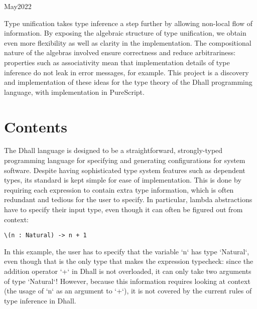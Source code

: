\documentclass[11pt, twoside, reqno]{book}
\makeatletter
\renewcommand\tableofcontents{%
    \if@twocolumn
      \@restonecoltrue\onecolumn
    \else
      \@restonecolfalse
    \fi
    \chapter*{\contentsname
        \@mkboth{%
           \contentsname}{\contentsname}}%
    \@starttoc{toc}%
    \if@restonecol\twocolumn\fi
    }
\makeatother
\begin{document}
\renewcommand{\contentsname}{Contents}
\fancyhead[LE]{\textit{\nouppercase{\leftmark}}}
\fancyhead[RO]{\textit{\nouppercase{\rightmark}}}

    {May}{2022}

\abstr

Type unification takes type inference a step further by allowing non-local flow of information.
By exposing the algebraic structure of type unification, we obtain even more flexibility as well as clarity in the implementation.
The compositional nature of the algebras involved ensure correctness and reduce arbitrariness: properties such as associativity mean that implementation details of type inference do not leak in error messages, for example.
This project is a discovery and implementation of these ideas for the type theory of the Dhall programming language, with implementation in PureScript.


\tableofcontents





\startmain

\intro

The Dhall language is designed to be a straightforward, strongly-typed programming language for specifying and generating configurations for system software.
Despite having sophisticated type system features such as dependent types, its standard is kept simple for ease of implementation.
This is done by requiring each expression to contain extra type information, which is often redundant and tedious for the user to specify.
In particular, lambda abstractions have to specify their input type, even though it can often be figured out from context:
\begin{verbatim}
\(n : Natural) -> n + 1
\end{verbatim}
In this example, the user has to specify that the variable \inHS`n` has type \inHS`Natural`, even though that is the only type that makes the expression typecheck: since the addition operator \inHS`+` in Dhall is not overloaded, it can only take two arguments of type \inHS`Natural`!
However, because this information requires looking at context (the usage of \inHS`n` as an argument to \inHS`+`), it is not covered by the current rules of type inference in Dhall.
\end{document}
